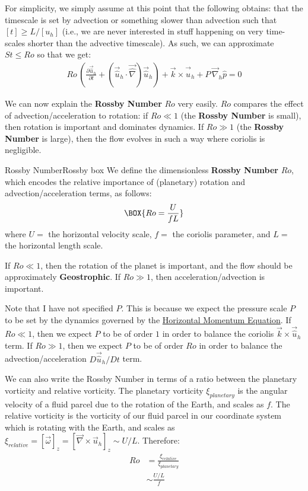 For simplicity, we simply assume at this point that the following obtains: that the timescale is set by advection or something slower than advection such that \([t]\geq L/[u_h]\) (i.e., we are never interested in stuff happening on very time-scales shorter than the advective timescale). As such, we can approximate \(St\leq Ro\) so that we get:
\begin{align*}
    Ro\,\left( \frac{\partial\vec{\hat{u}}_h}{\partial t}+\left( \vec{\hat{u}}_h\cdot\vec{\hat{\nabla}} \right)\vec{\hat{u}}_h\right)+\vec{k}\times\vec{\hat{u}}_h +P\,\vec{\nabla}_h\hat{p}=0
\end{align*}

We can now explain the \textbf{Rossby Number} \(Ro\) very easily. \(Ro\) compares the effect of advection/acceleration to rotation: if \(Ro \ll 1\) (the \textbf{Rossby Number} is small), then rotation is important and dominates dynamics. If \(Ro \gg 1\) (the \textbf{Rossby Number} is large), then the flow evolves in such a way where coriolis is negligible.

\begin{fact}{Rossby Number}{Rossby box}\label{Rossby Box}
    We define the dimensionless \textbf{Rossby Number} \(Ro\), which encodes the relative importance of (planetary) rotation and advection/acceleration terms, as follows:
    \begin{gather}
        \label{Rossby Number}
        \BOX{
            Ro=\frac{U}{fL}
        }
    \end{gather}
    where \(U=\) the horizontal velocity scale, \(f=\) the coriolis parameter, and \(L=\) the horizontal length scale.
    
    If \(Ro\ll 1\), then the rotation of the planet is important, and the flow should be approximately \textbf{Geostrophic}. If \(Ro\gg 1\), then acceleration/advection is important.
\end{fact}

Note that I have not specified \(P\). This is because we expect the pressure scale \(P\) to be set by the dynamics governed by the \hyperref[Horizontal Approximate]{Horizontal Momentum Equation}. If \(Ro\ll 1\), then we expect \(P\) to be of order \(1\) in order to balance the coriolis \(\vec{k}\times\vec{\hat{u}}_h\) term. If \(Ro\gg 1\), then we expect \(P\) to be of order \(Ro\) in order to balance the advection/acceleration \(D\vec{\hat{u}}_h/Dt\) term. 

We can also write the Rossby Number in terms of a ratio between the planetary vorticity and relative vorticity. The planetary vorticity \(\xi_{planetary}\) is the angular velocity of a fluid parcel due to the rotation of the Earth, and scales as \(f\). The relative vorticity is the vorticity of our fluid parcel in our coordinate system which is rotating with the Earth, and scales as \(\xi_{relative}=[\vec{\omega}]_z=[\vec{\nabla}\times\vec{u}_h]_z\sim U/L\). Therefore:
\begin{align}
    Ro &= \frac{\xi_{relative}}{\xi_{planetary}}\\
    &\sim\frac{U/L}{f}
\end{align}

